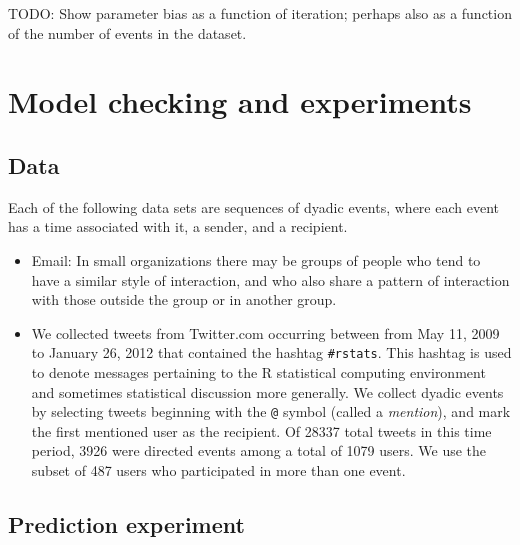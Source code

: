 \documentclass[11pt]{article}
\begin{document}
TODO: Show parameter bias as a function of iteration; perhaps also as a function of the number of events in the dataset.

\section{Model checking and experiments}

\subsection*{Data}

Each of the following data sets are sequences of dyadic events, where each event has a time associated with it, a sender, and a recipient.

\begin{itemize}
\item Email: In small organizations there may be groups of people who tend to have a similar style of interaction, and who also share a pattern of interaction with those outside the group or in another group.
\item We collected tweets from Twitter.com occurring between from May 11, 2009 to January 26, 2012 that contained the hashtag \texttt{#rstats}.  This hashtag is used to denote messages pertaining to the R statistical computing environment and sometimes statistical discussion more generally.  We collect dyadic events by selecting tweets beginning with the \texttt{@} symbol (called a \emph{mention}), and mark the first mentioned user as the recipient.  Of 28337 total tweets in this time period, 3926 were directed events among a total of 1079 users.  We use the subset of 487 users who participated in more than one event.
\end{itemize}

\subsection*{Prediction experiment}
\end{document}
